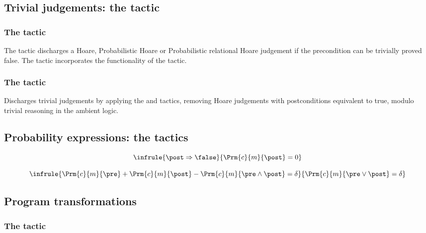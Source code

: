 
\subsection{Trivial judgements: the  tactic}

\subsubsection*{The  tactic}

The  tactic discharges a Hoare, Probabilistic Hoare or
Probabilistic relational Hoare judgement if the precondition can be
trivially proved false. The  tactic incorporates the
functionality of the  tactic.


\subsubsection*{The  tactic}

Discharges trivial judgements by applying the  and
 tactics, removing Hoare judgements with
postconditions equivalent to true, modulo trivial reasoning
in the ambient logic.


\subsection{Probability expressions: the  tactics}

\begin{displaymath}
\infrule{
  \post \Rightarrow \false
}{
  \Prm{c}{m}{\post} = 0
}
\end{displaymath}

\begin{displaymath}
\infrule{
\Prm{c}{m}{\pre} +  \Prm{c}{m}{\post} - \Prm{c}{m}{\pre \wedge \post} = \delta
}{
  \Prm{c}{m}{\pre \vee \post} = \delta
}
\end{displaymath}



\subsection{Program transformations}
%

\subsubsection*{The  tactic}
%


